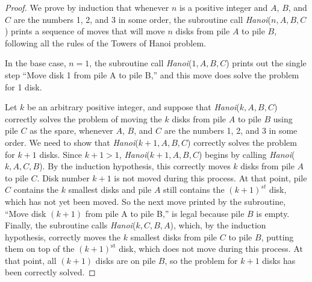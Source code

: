 \begin{proof}
We prove by induction that whenever $n$ is a positive integer and
$A$, $B$, and $C$ are the numbers 1, 2, and 3 in some order, 
the subroutine call \textit{Hanoi}($n,A,B,C$)
prints a sequence of moves that will move $n$ disks from pile $A$ to
pile $B$, following all the rules of the Towers of Hanoi problem.

In the base case, $n=1$,
the subroutine call \textit{Hanoi}($1,A,B,C$) prints out the single
step ``Move disk 1 from pile A to pile B,'' and this move does solve
the problem for 1 disk.

Let $k$ be an arbitrary positive integer, and suppose that
\textit{Hanoi}($k,A,B,C$) correctly solves the problem 
of moving the $k$ disks from pile $A$ to pile $B$ using pile $C$ as the spare,
whenever $A$, $B$, and $C$ are the numbers 1, 
2, and 3 in some order.  We need to show that 
\textit{Hanoi}($k+1,A,B,C$) correctly solves the problem for
$k+1$ disks.  Since $k+1>1$, \textit{Hanoi}($k+1,A,B,C$) begins by
calling \textit{Hanoi}($k,A,C,B$).  By the induction hypothesis,
this correctly moves $k$ disks from pile $A$ to pile $C$.  Disk number
$k+1$ is not moved during this process.
At that point, pile $C$ contains the $k$ smallest disks and
pile $A$ still contains the $(k+1)^{st}$ disk, which has not
yet been moved.  So the next move printed by the subroutine,
``Move disk $(k+1)$ from pile A to pile B,'' is legal because pile $B$ is empty.
Finally, the subroutine calls \textit{Hanoi}($k,C,B,A$),
which, by the induction hypothesis, correctly moves the $k$ smallest disks from 
pile $C$ to pile $B$, putting
them on top of the $(k+1)^{\text{st}}$ disk, which does not move during this process.
At that point, all $(k+1)$
disks are on pile $B$, so the problem for
$k+1$ disks has been correctly solved.
\end{proof}

